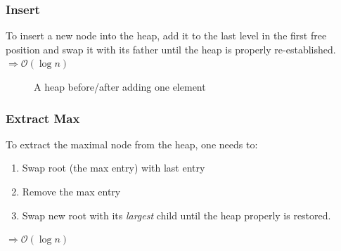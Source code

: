 \subsubsection{Insert} 
To insert a new node into the heap, add it to the last level in the first free position and swap it with its father until the heap is properly re-established. \newline
$\Rightarrow \mathcal{O}(\log n)$\\

\begin{figure}[htbp]
\centering
{}
\caption{A heap before/after adding one element}
\label{tree2_3}
\end{figure}

\subsubsection{Extract Max} To extract the maximal node from the heap, one needs to:
\begin{enumerate}
\item Swap root (the max entry) with last entry
\item Remove the max entry
\item Swap new root with its \emph{largest} child until the heap properly is restored.
\end{enumerate}
$\Rightarrow \mathcal{O}(\log n)$
\\ \\

